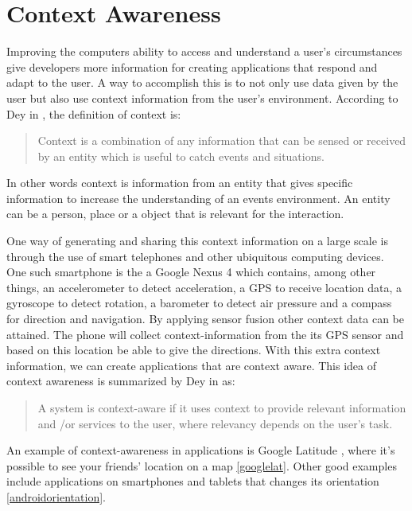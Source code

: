\section{Context Awareness}
Improving the computers ability to access and understand a user's circumstances give developers more information for creating  applications that respond and adapt to the user. A way to accomplish this is to not only use data given by the user but also use context information from the user's environment. According to Dey in \cite{dey2001understanding}, the definition of context is:

\begin{quotation}
\centering
Context is a combination of any information that can be sensed or received by an entity which is useful to catch events and situations.
\end{quotation}

In other words context is information from an entity that gives specific information to increase the understanding of an events environment. An entity can be a person, place or a object that is relevant for the interaction. 

One way of generating and sharing this context information on a large scale is through the use of smart telephones and other ubiquitous computing devices. One such smartphone is the a Google Nexus 4 \cite{GoogleNexus} which contains, among other things, an accelerometer to detect acceleration, a GPS to receive location data, a gyroscope to detect rotation, a barometer to detect air pressure and a compass for direction and navigation. By applying sensor fusion \cite{Elmenreich02sensorfusion} other context data can be attained. The phone will collect context-information from the its GPS sensor and based on this location be able to give the directions. With this extra context information, we can create applications that are context aware. This idea of context awareness is summarized by Dey in \cite{dey2001understanding} as: 

\begin{quotation}
\centering
A system is context-aware if it uses context to provide relevant information and \slash or services to the user, where relevancy depends on the user's task.
\end{quotation}

An example of context-awareness in applications is Google Latitude \cite{GoogleLatitude}, where it's possible to see your friends' location on a map \ref{googlelat}. Other good examples include applications on smartphones and tablets that changes its orientation \ref{androidorientation}.

